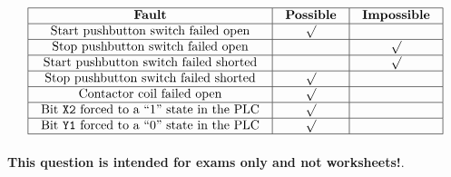 






$$\vbox{\offinterlineskip
\halign{\strut
\vrule \quad\hfil # \ \hfil & 
\vrule \quad\hfil # \ \hfil & 
\vrule \quad\hfil # \ \hfil \vrule \cr
\noalign{\hrule}
%
{\bf Fault} & {\bf Possible} & {\bf Impossible} \cr
%
\noalign{\hrule}
%
Start pushbutton switch failed open & $\surd$ &  \cr
%
\noalign{\hrule}
%
Stop pushbutton switch failed open &  & $\surd$ \cr
%
\noalign{\hrule}
%
Start pushbutton switch failed shorted &  & $\surd$ \cr
%
\noalign{\hrule}
%
Stop pushbutton switch failed shorted & $\surd$ &  \cr
%
\noalign{\hrule}
%
Contactor coil failed open & $\surd$ &  \cr
%
\noalign{\hrule}
%
Bit {\tt X2} forced to a ``1'' state in the PLC & $\surd$ &  \cr
%
\noalign{\hrule}
%
Bit {\tt Y1} forced to a ``0'' state in the PLC & $\surd$ &  \cr
%
\noalign{\hrule}
} %
}$$ %








{\bf This question is intended for exams only and not worksheets!}.


